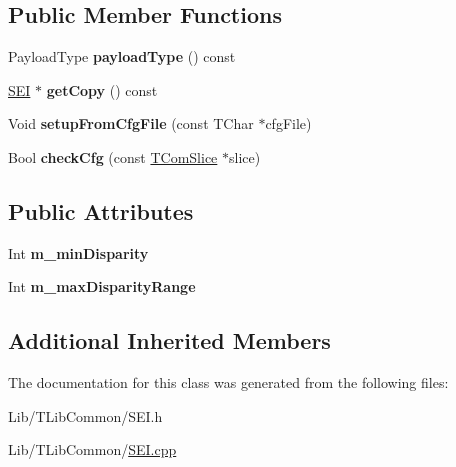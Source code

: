 \subsection*{Public Member Functions}
\begin{DoxyCompactItemize}
\item 
\mbox{\label{class_s_e_i_multiview_scene_info_ae882b7278684e28816f6f137a5bf121e}} 
Payload\+Type {\bfseries payload\+Type} () const
\item 
\mbox{\label{class_s_e_i_multiview_scene_info_a5f55e34071b6802ecf243662c2dc711a}} 
\hyperlink{class_s_e_i}{S\+EI} $\ast$ {\bfseries get\+Copy} () const
\item 
\mbox{\label{class_s_e_i_multiview_scene_info_a6a0e6d3691b2cf5f157d99de8f6ebd0a}} 
Void {\bfseries setup\+From\+Cfg\+File} (const T\+Char $\ast$cfg\+File)
\item 
\mbox{\label{class_s_e_i_multiview_scene_info_a0b47771d72b0c84d1bd72c0f90f680fb}} 
Bool {\bfseries check\+Cfg} (const \hyperlink{class_t_com_slice}{T\+Com\+Slice} $\ast$slice)
\end{DoxyCompactItemize}
\subsection*{Public Attributes}
\begin{DoxyCompactItemize}
\item 
\mbox{\label{class_s_e_i_multiview_scene_info_a1b620a0a9b75ed25a6bee97091baf6ea}} 
Int {\bfseries m\+\_\+min\+Disparity}
\item 
\mbox{\label{class_s_e_i_multiview_scene_info_aae573500e7df058a677cfa4261e5b801}} 
Int {\bfseries m\+\_\+max\+Disparity\+Range}
\end{DoxyCompactItemize}
\subsection*{Additional Inherited Members}


The documentation for this class was generated from the following files\+:\begin{DoxyCompactItemize}
\item 
Lib/\+T\+Lib\+Common/S\+E\+I.\+h\item 
Lib/\+T\+Lib\+Common/\hyperlink{_s_e_i_8cpp}{S\+E\+I.\+cpp}\end{DoxyCompactItemize}
